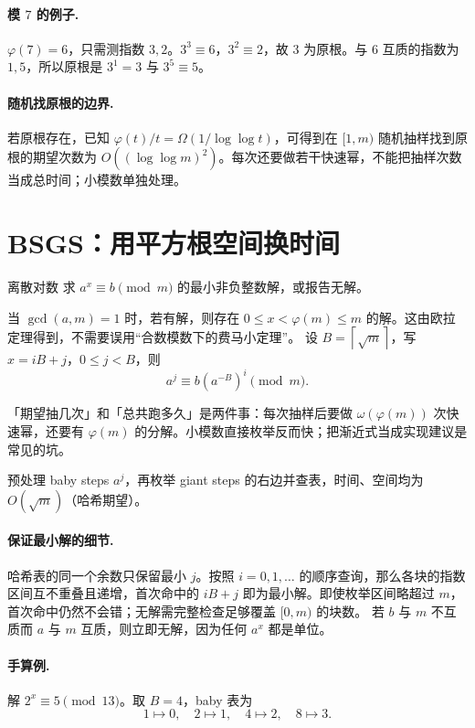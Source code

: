 \documentclass[UTF8,a4paper,11pt,twoside,openright,fontset=fandol]{ctexbook}
\theoremstyle{definition}
\newcommand{\ceil}[1]{\left\lceil #1\right\rceil}
\begin{document}
\paragraph{模 $7$ 的例子.} $\varphi(7)=6$，只需测指数 $3,2$。$3^3\equiv6$，$3^2\equiv2$，故 $3$ 为原根。与 $6$ 互质的指数为 $1,5$，所以原根是 $3^1=3$ 与 $3^5\equiv5$。
\paragraph{随机找原根的边界.} 若原根存在，已知 $\varphi(t)/t=\Omega(1/\log\log t)$，可得到在 $[1,m)$ 随机抽样找到原根的期望次数为 $O((\log\log m)^2)$。每次还要做若干快速幂，不能把抽样次数当成总时间；小模数单独处理。


\section{BSGS：用平方根空间换时间}
\begin{problem}{离散对数}
求 $a^x\equiv b\pmod m$ 的最小非负整数解，或报告无解。
\end{problem}
当 $\gcd(a,m)=1$ 时，若有解，则存在 $0\le x<\varphi(m)\le m$ 的解。这由欧拉定理得到，不需要误用“合数模数下的费马小定理”。
设 $B=\ceil{\sqrt m}$，写 $x=iB+j$，$0\le j<B$，则
\[
 a^j\equiv b(a^{-B})^i\pmod m.
\]

\begin{tip}
「期望抽几次」和「总共跑多久」是两件事：每次抽样后要做 $\omega(\varphi(m))$ 次快速幂，还要有 $\varphi(m)$ 的分解。小模数直接枚举反而快；把渐近式当成实现建议是常见的坑。
\end{tip}

预处理 baby steps $a^j$，再枚举 giant steps 的右边并查表，时间、空间均为 $O(\sqrt m)$（哈希期望）。


\paragraph{保证最小解的细节.}
哈希表的同一个余数只保留最小 $j$。按照 $i=0,1,\ldots$ 的顺序查询，那么各块的指数区间互不重叠且递增，首次命中的 $iB+j$ 即为最小解。即使枚举区间略超过 $m$，首次命中仍然不会错；无解需完整检查足够覆盖 $[0,m)$ 的块数。
若 $b$ 与 $m$ 不互质而 $a$ 与 $m$ 互质，则立即无解，因为任何 $a^x$ 都是单位。

\paragraph{手算例.} 解 $2^x\equiv5\pmod{13}$。取 $B=4$，baby 表为
\[
1\mapsto0,\quad2\mapsto1,\quad4\mapsto2,\quad8\mapsto3.
\]
\end{document}
